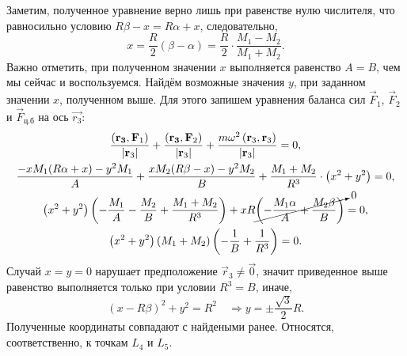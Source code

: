 Заметим, полученное уравнение верно лишь при равенстве нулю числителя, что равносильно условию $R \beta - x = R \alpha + x$, следовательно,
\begin{equation*}
    x = \frac{R}{2} \left( \beta - \alpha \right) = \frac{R}{2} \cdot \frac{M_1 - M_2}{M_1 + M_2}.
\end{equation*}
Важно отметить, при полученном значении $x$ выполняется равенство $A = B$, чем мы сейчас и воспользуемся. Найдём возможные значения $y$, при заданном значении $x$, полученном выше. Для этого запишем уравнения баланса сил  $\vec{F}_1$, $\vec{F}_2$ и $\vec{F}_\text{ц.б}$ на ось $\vec{r_3}$:
\begin{gather*}
    \frac{ \left( \vec{r_3},  \vec{F}_1 \right)}{\left| \vec{r}_3 \right|} + \frac{ \left( \vec{r_3}, \vec{F}_2 \right)}{\left| \vec{r}_3\right|} + \frac{m \omega^2 \left(\vec{r}_3, \vec{r}_3\right)}{\left| \vec{r}_3\right|} = 0,\\
    \frac{-x M_1 (R \alpha + x) - y^2 M_1}{A} + \frac{ x M_2 ( R \beta - x) - y^2 M_2}{B} + \frac{M_1 + M_2}{R^3} \cdot \left( x^2 + y^2 \right) = 0,\\
    \left( x^2 + y^2 \right) \left(   - \frac{M_1}{A} - \frac{M_2}{B} + \frac{M_1 + M_2}{R^3}\right) + xR \cancelto{0}{\left(  - \frac{M_1 \alpha}{A} + \frac{M_2 \beta}{B} \right)} = 0,\\
    \left( x^2 + y^2 \right)(M_1 + M_2) \left(  - \frac{1}{B} + \frac{1}{R^3} \right) = 0.
\end{gather*}
Случай $x = y = 0$ нарушает предположение $\vec{r}_3 \not = \vec{0}$, значит приведенное выше равенство выполняется только при условии $R^3 = B$, иначе,
\begin{equation*}
(x - R \beta)
    ^2 + y^2 = R^2 \quad \Rightarrow y = \pm \frac{\sqrt{3}}{2} R.
\end{equation*}
Полученные координаты совпадают с найдеными ранее. Относятся, соответственно, к точкам $L_4$ и $L_5$.

